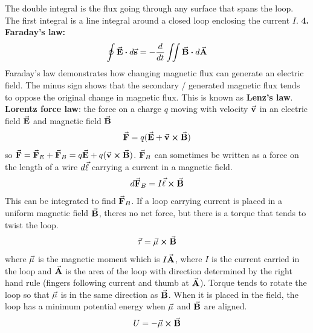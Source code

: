             The double integral is the flux going through any surface that spans the loop. The first integral is a line integral around a closed loop enclosing the current $I$.
            \newline
        \textbf{4. Faraday's law:}
            \begin{equation*}
                \oint \va{E} \vdot d\va{s} = - \frac{d}{dt} \iint \va{B} \vdot d\va{A} 
            \end{equation*}
            Faraday's law demonstrates how changing magnetic flux can generate an electric field. The minus sign shows that the secondary / generated magnetic flux tends to oppose the original change in magnetic flux. This is known as \textbf{Lenz's law}.
            \newline
        \newline
        \newline
    \textbf{Lorentz force law}: the force on a charge $q$ moving with velocity $\va{v}$ in an electric field $\va{E}$ and magnetic field $\va{B}$
    \begin{equation*}
        \va{F} = q(\va{E} + \va{v} \cross \va{B})
    \end{equation*}
    so $\va{F} = \va{F}_E + \va{F}_B = q\va{E} + q(\va{v} \cross \va{B})$. $\va{F}_B$ can sometimes be written as a force on the length of a wire $d\va{\ell}$ carrying a current in a magnetic field.
    \begin{equation*}
        d\va{F}_B = I\va{\ell} \cross \va{B}
    \end{equation*}
    This can be integrated to find $\va{F}_B$.
    \newline \indent
    If a loop carrying current is placed in a uniform magnetic field $\va{B}$, theres no net force, but there is a torque that tends to twist the loop.
    \begin{equation*}
        \va{\tau} = \va{\mu} \cross \va{B}
    \end{equation*}
    where $\va{\mu}$ is the magnetic moment which is $I\va{A}$, where $I$ is the current carried in the loop and $\va{A}$ is the area of the loop with direction determined by the right hand rule (fingers following current and thumb at $\va{A}$). Torque tends to rotate the loop so that $\va{\mu}$ is in the same direction as $\va{B}$. When it is placed in the field, the loop has a minimum potential energy when $\va{\mu}$ and $\va{B}$ are aligned.
    \begin{equation*}
        U = - \va{\mu} \cross \va{B}
    \end{equation*}
